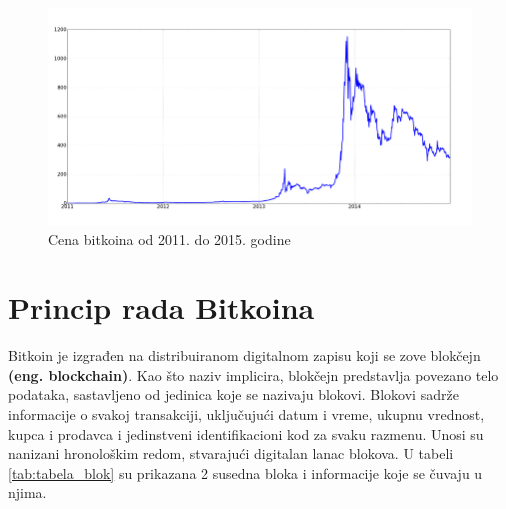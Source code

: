 \documentclass[a4paper]{article}
\begin{document}
\begin{figure}[h!]
	\begin{center}
		\includegraphics[scale=0.4]{chart.png}
	\end{center}
	\caption{Cena bitkoina od 2011. do 2015. godine}
	\label{fig:grafikon}
\end{figure}

\section{Princip rada Bitkoina}
\label{sec:princip_rada}

Bitkoin je izgrađen na distribuiranom digitalnom zapisu koji se zove blokčejn \textbf{(eng. blockchain)}. Kao što naziv implicira, blokčejn predstavlja povezano telo podataka, sastavljeno od jedinica koje se nazivaju blokovi. Blokovi sadrže informacije o svakoj transakciji, uključujući datum i vreme, ukupnu vrednost, kupca i prodavca i jedinstveni identifikacioni kod za svaku razmenu. Unosi su nanizani hronološkim redom, stvarajući digitalan lanac blokova.\cite{princip_rada} U tabeli \ref{tab:tabela_blok} su prikazana 2 susedna bloka i informacije koje se čuvaju u njima.
\\
\end{document}
